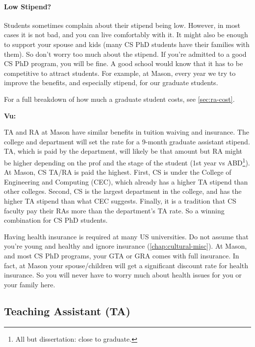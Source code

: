 \documentclass[oneside,11pt,dvipsnames]{book}
\newenvironment{commentbox}[1][]{
  \small
  \begin{mybox}
    {\small \textbf{#1}}
  }{
  \end{mybox}
}
\begin{document}
\paragraph{Low Stipend?} Students sometimes complain about their stipend being low. However, in most cases it is not bad, and you can live comfortably with it.  It might also be enough to support your spouse and kids (many CS PhD students have their families with them). So don't worry too much about the stipend.  If you're admitted to a good CS PhD program, you will be fine. A good school would know that it has to be competitive to attract students.  For example, at Mason, every year we try to improve the benefits, and especially stipend, for our graduate students.

For a full breakdown of how much a graduate student costs, see \autoref{sec:ra-cost}.


\begin{commentbox}[Vu:]
  TA and RA at Mason have similar benefits in tuition waiving and insurance.  The college and department will set the rate for a 9-month graduate assistant stipend.  TA, which is paid by the department, will likely be that amount but RA might be higher depending on  the prof and the stage of the student (1st year vs ABD\footnote{All but dissertation: close to graduate.}).\\

  At Mason, CS TA/RA is paid the highest.  First, CS is under the College of Engineering and Computing (CEC), which already has a higher TA stipend than other colleges.  Second, CS is the largest department in the college, and has the higher TA stipend than what CEC suggests.  Finally, it is a tradition that CS faculty pay their RAs more than the department's TA rate.  So a winning combination for CS PhD students.
  
  \tcblower
  Having health insurance is required at many US universities.  Do not assume that you're young and healthy and ignore insurance (\autoref{chap:cultural-misc}).  At Mason, and most CS PhD programs, your GTA or GRA comes with full insurance. In fact, at Mason your spouse/children will get a significant discount rate for health insurance.  So you will never have to worry much about health issues for you or your family here.
\end{commentbox}


\subsection{Teaching Assistant (TA)}\label{sec:ta}
\end{document}
